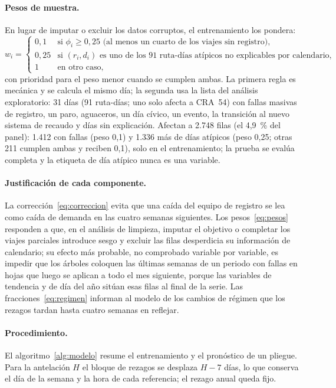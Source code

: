 \paragraph{Pesos de muestra.}
En lugar de imputar o excluir los datos corruptos, el entrenamiento los pondera:
\begin{equation}
  w_i =
  \begin{cases}
    0{,}1  & \text{si } \phi_i \geq 0{,}25 \text{ (al menos un cuarto de los viajes sin registro)}, \\
    0{,}25 & \text{si } (r_i, d_i) \text{ es uno de los 91 ruta-días atípicos no explicables por calendario}, \\
    1      & \text{en otro caso},
  \end{cases}
  \label{eq:pesos}
\end{equation}
con prioridad para el peso menor cuando se cumplen ambas. La primera regla es mecánica y se calcula el mismo
día; la segunda usa la lista del análisis exploratorio: 31 días (91 ruta-días; uno solo afecta a CRA~54)
con fallas masivas de registro, un paro, aguaceros, un día cívico, un evento, la transición al nuevo
sistema de recaudo y días sin explicación. Afectan a
2.748 filas (el 4,9~\% del panel): 1.412 con fallas (peso 0,1) y 1.336 más de días atípicos (peso 0,25;
otras 211 cumplen ambas y reciben 0,1), solo en el entrenamiento; la prueba se evalúa completa y la etiqueta
de día atípico nunca es una variable.

\paragraph{Justificación de cada componente.}
La corrección~\eqref{eq:correccion} evita que una caída del equipo de registro se lea como caída de demanda en las cuatro semanas siguientes.
Los pesos~\eqref{eq:pesos} responden a que, en el análisis de limpieza, imputar el objetivo o completar los
viajes parciales introduce sesgo y excluir las filas desperdicia su información de calendario; su efecto
más probable, no comprobado variable por variable, es impedir que los árboles coloquen las últimas semanas
de un periodo con fallas en hojas que luego se aplican a todo el mes siguiente, porque las variables de
tendencia y de día del año sitúan esas filas al final de la serie. Las fracciones~\eqref{eq:regimen}
informan al modelo de los cambios de régimen que los rezagos tardan hasta cuatro semanas en reflejar.

\paragraph{Procedimiento.}
El algoritmo~\ref{alg:modelo} resume el entrenamiento y el pronóstico de un pliegue. Para la antelación
$H$ el bloque de rezagos se desplaza $H - 7$ días, lo que conserva el día de la semana y la hora de cada
referencia; el rezago anual queda fijo.

